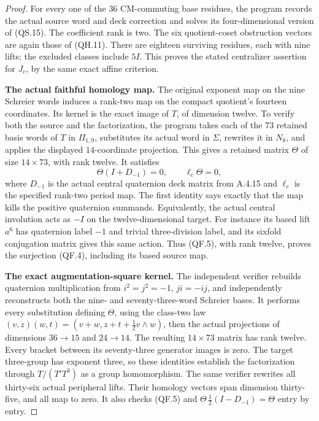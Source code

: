 \begin{proof}
For every one of the $36$ CM-commuting base residues,
the program records the actual source word and deck
correction and solves its four-dimensional version
of (QS.15).  The coefficient rank is two.  The six
quotient-coset obstruction vectors are again those
of (QH.11).  There are eighteen surviving residues,
each with nine lifts; the excluded classes include
$5I$.  This proves the stated centralizer assertion
for $J_c$, by the same exact affine criterion.

\textbf{The actual faithful homology map.}
The original exponent map on the nine Schreier words
induces a rank-two map on the compact quotient's
fourteen coordinates.  Its kernel is the exact
image of $T$, of dimension twelve.  To verify both
the source and the factorization, the program takes
each of the $73$ retained basis words of $T$ in
$\Pi_{1,9}$, substitutes its actual word in $\Sigma$,
rewrites it in $N_8$, and applies the displayed
$14$-coordinate projection.  This gives a retained
matrix $\Theta$ of size $14\times73$, with rank twelve.
It satisfies
\[
 \Theta(I+D_{-1})=0,\qquad
 \ell_c\Theta=0,                                     \tag{QF.5}
\]
where $D_{-1}$ is the actual central quaternion deck
matrix from A.4.15 and $\ell_c$ is the specified
rank-two period map.  The first identity says exactly
that the map kills the positive quaternion summands.
Equivalently, the actual central involution acts
as $-I$ on the twelve-dimensional target.
For instance its based lift $a^6$ has quaternion
label $-1$ and trivial three-division label, and its
sixfold conjugation matrix gives this same action.
Thus (QF.5), with rank twelve, proves the surjection
(QF.4), including its based source map.

\textbf{The exact augmentation-square kernel.}
The independent verifier
rebuilds quaternion multiplication from
$i^2=j^2=-1$, $ji=-ij$, and independently reconstructs
both the nine- and seventy-three-word Schreier bases.
It performs every substitution defining $\Theta$,
using the class-two law
$(v,z)(w,t)=(v+w,z+t+\tfrac12v\wedge w)$,
then the actual projections of dimensions
$36\to15$ and $24\to14$.
The resulting $14\times73$ matrix has rank twelve.
Every bracket between its seventy-three generator
images is zero.  The target three-group has exponent
three, so these identities establish the factorization
through $T/(T'T^3)$ as a group homomorphism.
The same verifier rewrites all thirty-six actual
peripheral lifts.  Their homology vectors span
dimension thirty-five, and all map to zero.
It also checks (QF.5) and
$\Theta\,\tfrac12(I-D_{-1})=\Theta$ entry by entry.


\end{proof}
